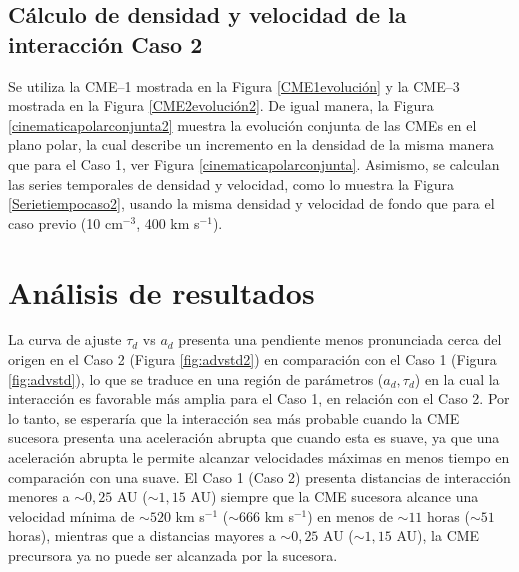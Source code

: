\subsection{Cálculo de densidad y velocidad de la interacción Caso 2}
Se utiliza la CME--1 mostrada en la Figura \ref{CME1evolución} y la CME--3 mostrada en la Figura \ref{CME2evolución2}. De igual manera, la Figura \ref{cinematicapolarconjunta2} muestra la evolución conjunta de las CMEs en el plano polar, la cual describe un incremento en la densidad de la misma manera que para el Caso 1, ver Figura \ref{cinematicapolarconjunta}. Asimismo, se calculan las series temporales de densidad y velocidad, como lo muestra la Figura \ref{Serietiempocaso2}, usando la misma densidad y velocidad de fondo que para el caso previo (10 cm$^{-3}$, 400 km s$^{-1}$).

\section{Análisis de resultados}
\label{análisisderesultados}
La curva de ajuste $\tau_d$ vs $a_d$ presenta una pendiente menos pronunciada cerca del origen en el Caso 2 (Figura \ref{fig:advstd2}) en comparación con el Caso 1 (Figura \ref{fig:advstd}), lo que se traduce en una región de parámetros ($a_d,\tau_d$) en la cual la interacción es favorable más amplia para el Caso 1, en relación con el Caso 2. Por lo tanto, se esperaría que la interacción sea más probable cuando la CME sucesora presenta una aceleración abrupta que cuando esta es suave, ya que una aceleración abrupta le permite alcanzar velocidades máximas en menos tiempo en comparación con una suave. El Caso 1 (Caso 2) presenta distancias de interacción menores a $\sim0{,}25$ AU ($\sim1{,}15$ AU) siempre que la CME sucesora alcance una velocidad mínima de $\sim520$ km s$^{-1}$ ($\sim666$ km s$^{-1}$) en menos de $\sim11$ horas ($\sim51$ horas), mientras que a distancias mayores a $\sim0{,}25$ AU ($\sim1{,}15$ AU), la CME precursora ya no puede ser alcanzada por la sucesora. 

